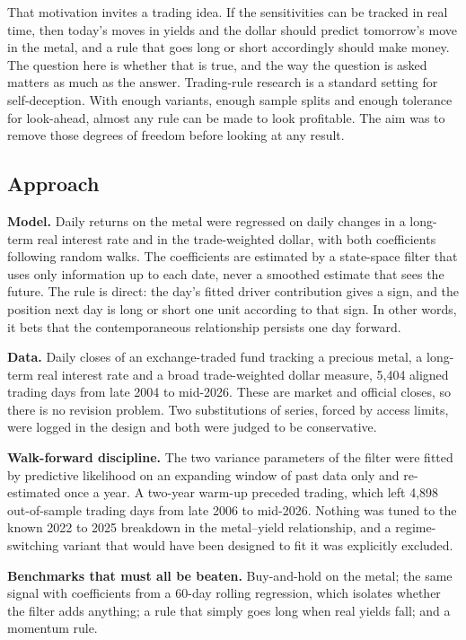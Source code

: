 \documentclass[
  british,
  a4paper,
]{article}
\begin{document}
That motivation invites a trading idea. If the sensitivities can be
tracked in real time, then today's moves in yields and the dollar should
predict tomorrow's move in the metal, and a rule that goes long or short
accordingly should make money. The question here is whether that is
true, and the way the question is asked matters as much as the answer.
Trading-rule research is a standard setting for self-deception. With
enough variants, enough sample splits and enough tolerance for
look-ahead, almost any rule can be made to look profitable. The aim was
to remove those degrees of freedom before looking at any result.

\subsection{Approach}\label{approach}

\textbf{Model.} Daily returns on the metal were regressed on daily
changes in a long-term real interest rate and in the trade-weighted
dollar, with both coefficients following random walks. The coefficients
are estimated by a state-space filter that uses only information up to
each date, never a smoothed estimate that sees the future. The rule is
direct: the day's fitted driver contribution gives a sign, and the
position next day is long or short one unit according to that sign. In
other words, it bets that the contemporaneous relationship persists one
day forward.

\textbf{Data.} Daily closes of an exchange-traded fund tracking a
precious metal, a long-term real interest rate and a broad
trade-weighted dollar measure, 5,404 aligned trading days from late 2004
to mid-2026. These are market and official closes, so there is no
revision problem. Two substitutions of series, forced by access limits,
were logged in the design and both were judged to be conservative.

\textbf{Walk-forward discipline.} The two variance parameters of the
filter were fitted by predictive likelihood on an expanding window of
past data only and re-estimated once a year. A two-year warm-up preceded
trading, which left 4,898 out-of-sample trading days from late 2006 to
mid-2026. Nothing was tuned to the known 2022 to 2025 breakdown in the
metal--yield relationship, and a regime-switching variant that would
have been designed to fit it was explicitly excluded.

\textbf{Benchmarks that must all be beaten.} Buy-and-hold on the metal;
the same signal with coefficients from a 60-day rolling regression,
which isolates whether the filter adds anything; a rule that simply goes
long when real yields fall; and a momentum rule.
\end{document}
